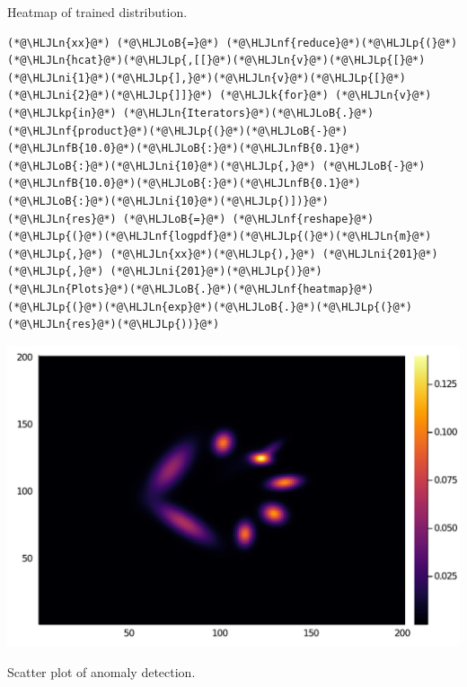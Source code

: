\documentclass[12pt,a4paper]{article}
\newcommand{\HLJLk}[1]{\textcolor[RGB]{148,91,176}{\textbf{#1}}}
\newcommand{\HLJLkp}[1]{\textcolor[RGB]{148,91,176}{\textbf{#1}}}
\newcommand{\HLJLn}[1]{#1}
\newcommand{\HLJLnf}[1]{\textcolor[RGB]{66,102,213}{#1}}
\newcommand{\HLJLnfB}[1]{\textcolor[RGB]{59,151,46}{#1}}
\newcommand{\HLJLni}[1]{\textcolor[RGB]{59,151,46}{#1}}
\newcommand{\HLJLoB}[1]{\textcolor[RGB]{102,102,102}{\textbf{#1}}}
\newcommand{\HLJLp}[1]{#1}
\begin{document}
Heatmap of trained distribution.


\begin{lstlisting}
(*@\HLJLn{xx}@*) (*@\HLJLoB{=}@*) (*@\HLJLnf{reduce}@*)(*@\HLJLp{(}@*)(*@\HLJLn{hcat}@*)(*@\HLJLp{,[[}@*)(*@\HLJLn{v}@*)(*@\HLJLp{[}@*)(*@\HLJLni{1}@*)(*@\HLJLp{],}@*)(*@\HLJLn{v}@*)(*@\HLJLp{[}@*)(*@\HLJLni{2}@*)(*@\HLJLp{]]}@*) (*@\HLJLk{for}@*) (*@\HLJLn{v}@*) (*@\HLJLkp{in}@*) (*@\HLJLn{Iterators}@*)(*@\HLJLoB{.}@*)(*@\HLJLnf{product}@*)(*@\HLJLp{(}@*)(*@\HLJLoB{-}@*)(*@\HLJLnfB{10.0}@*)(*@\HLJLoB{:}@*)(*@\HLJLnfB{0.1}@*)(*@\HLJLoB{:}@*)(*@\HLJLni{10}@*)(*@\HLJLp{,}@*) (*@\HLJLoB{-}@*)(*@\HLJLnfB{10.0}@*)(*@\HLJLoB{:}@*)(*@\HLJLnfB{0.1}@*)(*@\HLJLoB{:}@*)(*@\HLJLni{10}@*)(*@\HLJLp{)])}@*)
(*@\HLJLn{res}@*) (*@\HLJLoB{=}@*) (*@\HLJLnf{reshape}@*)(*@\HLJLp{(}@*)(*@\HLJLnf{logpdf}@*)(*@\HLJLp{(}@*)(*@\HLJLn{m}@*)(*@\HLJLp{,}@*) (*@\HLJLn{xx}@*)(*@\HLJLp{),}@*) (*@\HLJLni{201}@*)(*@\HLJLp{,}@*) (*@\HLJLni{201}@*)(*@\HLJLp{)}@*)
(*@\HLJLn{Plots}@*)(*@\HLJLoB{.}@*)(*@\HLJLnf{heatmap}@*)(*@\HLJLp{(}@*)(*@\HLJLn{exp}@*)(*@\HLJLoB{.}@*)(*@\HLJLp{(}@*)(*@\HLJLn{res}@*)(*@\HLJLp{))}@*)
\end{lstlisting}

\includegraphics[width=\linewidth]{jl_uOl600/test1_5_1.pdf}

Scatter plot of anomaly detection.
\end{document}
